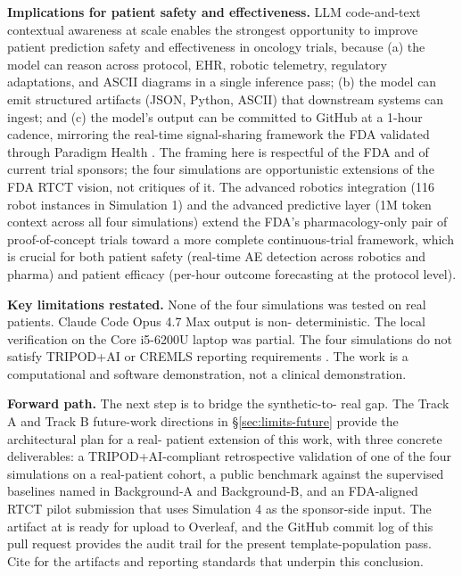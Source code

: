 \textbf{Implications for patient safety and effectiveness.} LLM
code-and-text contextual awareness at scale enables the strongest
opportunity to improve patient prediction safety and effectiveness in
oncology trials, because (a) the model can reason across protocol,
EHR, robotic telemetry, regulatory adaptations, and ASCII diagrams in
a single inference pass; (b) the model can emit structured artifacts
(JSON, Python, ASCII) that downstream systems can ingest; and (c) the
model's output can be committed to GitHub at a 1-hour cadence,
mirroring the real-time signal-sharing framework the FDA validated
through Paradigm Health \cite{fda2026realtime}. The framing here is
respectful of the FDA and of current trial sponsors; the four
simulations are opportunistic extensions of the FDA RTCT vision, not
critiques of it. The advanced robotics integration (116 robot
instances in Simulation 1) and the advanced predictive layer (1M
token context across all four simulations) extend the FDA's
pharmacology-only pair of proof-of-concept trials toward a more
complete continuous-trial framework, which is crucial for both
patient safety (real-time AE detection across robotics and pharma)
and patient efficacy (per-hour outcome forecasting at the protocol
level).

\textbf{Key limitations restated.} None of the four simulations was
tested on real patients. Claude Code Opus 4.7 Max output is non-
deterministic. The local verification on the Core i5-6200U laptop
was partial. The four simulations do not satisfy TRIPOD+AI or CREMLS
reporting requirements \cite{Collins2024TRIPODAI, ElEmam2024CREMLS}.
The work is a computational and software demonstration, not a
clinical demonstration.

\textbf{Forward path.} The next step is to bridge the synthetic-to-
real gap. The Track A and Track B future-work directions in
\S\ref{sec:limits-future} provide the architectural plan for a real-
patient extension of this work, with three concrete deliverables: a
TRIPOD+AI-compliant retrospective validation of one of the four
simulations on a real-patient cohort, a public benchmark against the
supervised baselines named in Background-A and Background-B, and an
FDA-aligned RTCT pilot submission that uses Simulation 4 as the
sponsor-side input. The artifact at
is ready for upload to Overleaf, and the GitHub commit log of this
pull request provides the audit trail for the present
template-population pass. Cite \cite{fda2026realtime,
kawchak_2026_19176370, kawchak_2026_19244918, kawchak_2026_18810541,
kawchak_2026_19119939, kawchak_2026_19396256, Collins2024TRIPODAI,
ElEmam2024CREMLS} for the artifacts and reporting standards that
underpin this conclusion.
